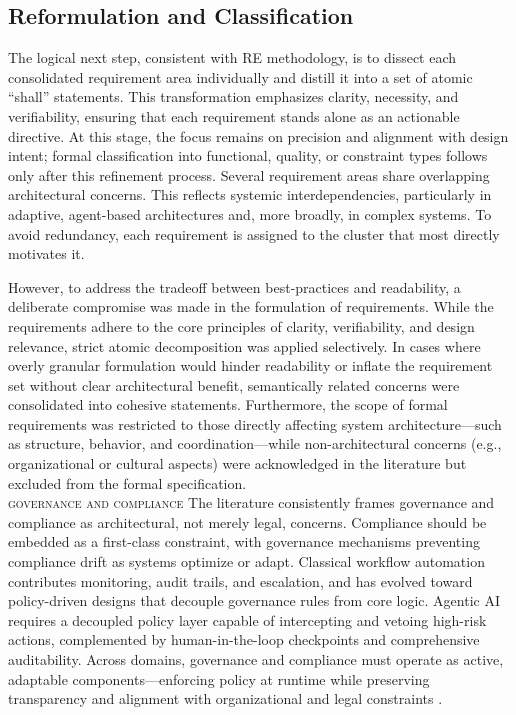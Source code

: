 \subsection{Reformulation and Classification}\label{subsec:req-clas}
The logical next step, consistent with RE methodology, is to dissect each consolidated requirement area individually and distill it into a set of atomic “shall” statements. This transformation emphasizes clarity, necessity, and verifiability, ensuring that each requirement stands alone as an actionable directive. At this stage, the focus remains on precision and alignment with design intent; formal classification into functional, quality, or constraint types follows only after this refinement process. Several requirement areas share overlapping architectural concerns. This reflects systemic interdependencies, particularly in adaptive, agent-based architectures and, more broadly, in complex systems. To avoid redundancy, each requirement is assigned to the cluster that most directly motivates it.

However, to address the tradeoff between best-practices and readability, a deliberate compromise was made in the formulation of requirements. While the requirements adhere to the core principles of clarity, verifiability, and design relevance, strict atomic decomposition was applied selectively. In cases where overly granular formulation would hinder readability or inflate the requirement set without clear architectural benefit, semantically related concerns were consolidated into cohesive statements. Furthermore, the scope of formal requirements was restricted to those directly affecting system architecture—such as structure, behavior, and coordination—while non-architectural concerns (e.g., organizational or cultural aspects) were acknowledged in the literature but excluded from the formal specification. \\

\noindent \textsc{governance and compliance} \quad The literature consistently frames governance and compliance as architectural, not merely legal, concerns. Compliance should be embedded as a first-class constraint, with governance mechanisms preventing compliance drift as systems optimize or adapt. Classical workflow automation contributes monitoring, audit trails, and escalation, and has evolved toward policy-driven designs that decouple governance rules from core logic. Agentic AI requires a decoupled policy layer capable of intercepting and vetoing high-risk actions, complemented by human-in-the-loop checkpoints and comprehensive auditability. Across domains, governance and compliance must operate as active, adaptable components—enforcing policy at runtime while preserving transparency and alignment with organizational and legal constraints \parencite{basuResearch2002, gauravGovernance2025}.

